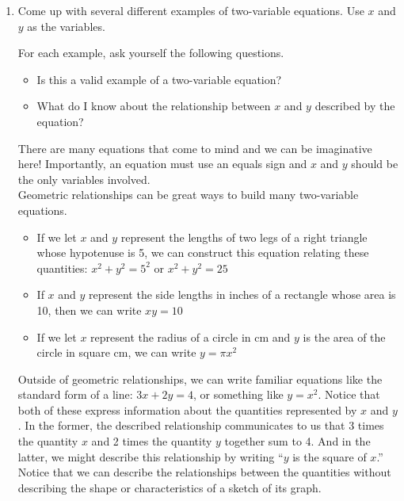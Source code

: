 \documentclass[main]{subfiles}
\begin{document}
\begin{enumerate}

\item \label{equation-examples}
\begin{problem}
Come up with several different examples of two-variable equations. 
Use $x$ and $y$ as the variables.

For each example, ask yourself the following questions.

\begin{itemize}[topsep=0pt]
    \item Is this a valid example of a two-variable equation?
    \item What do I know about the relationship between $x$ and $y$ described by the equation?
\end{itemize}
\end{problem}
\pspace{\vfill}

\begin{solution}
    There are many equations that come to mind and we can be imaginative here! Importantly, an equation must use an equals sign and $x$ and $y$ should be the only variables involved.\\
    Geometric relationships can be great ways to build many two-variable equations.
    \begin{itemize}
        \item If we let $x$ and $y$ represent the lengths of two legs of a right triangle whose hypotenuse is 5, we can construct this equation relating these quantities: $x^2+y^2=5^2$ or $x^2+y^2=25$
        \item If $x$ and $y$ represent the side lengths in inches of a rectangle whose area is 10, then we can write $xy=10$
        \item If we let $x$ represent the radius of a circle in cm and $y$ is the area of the circle in square cm, we can write $y=\pi x^2$
    \end{itemize}
    Outside of geometric relationships, we can write familiar equations like the standard form of a line: $3x+2y=4$, or something like $y=x^2$. Notice that both of these express information about the quantities represented by $x$ and $y$. In the former, the described relationship communicates to us that 3 times the quantity $x$ and 2 times the quantity $y$ together sum to 4. And in the latter, we might describe this relationship by writing ``$y$ is the square of $x$.'' Notice that we can describe the relationships between the quantities without describing the shape or characteristics of a sketch of its graph.
   

\end{solution}
\end{enumerate}
\end{document}
